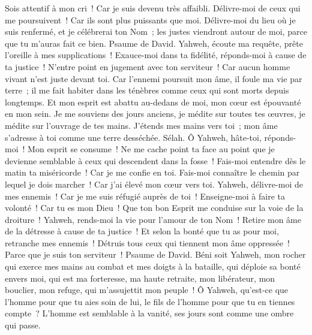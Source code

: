 \begin{multicols}{2}
Sois attentif à mon cri~! Car je suis devenu très affaibli. Délivre-moi de ceux qui me poursuivent~! Car ils sont plus puissants que moi.
Délivre-moi du lieu où je suis renfermé, et je célébrerai ton Nom~; les justes viendront autour de moi, parce que tu m'auras fait ce bien.
\VerseOne{}Psaume de David. Yahweh, écoute ma requête, prête l'oreille à mes supplications~! Exauce-moi dans ta fidélité, réponds-moi à cause de ta justice~!
N'entre point en jugement avec ton serviteur~! Car aucun homme vivant n'est juste devant toi.
Car l'ennemi poursuit mon âme, il foule ma vie par terre~; il me fait habiter dans les ténèbres comme ceux qui sont morts depuis longtemps.
Et mon esprit est abattu au-dedans de moi, mon cœur est épouvanté en mon sein.
Je me souviens des jours anciens, je médite sur toutes tes œuvres, je médite sur l'ouvrage de tes mains.
J'étends mes mains vers toi~; mon âme s'adresse à toi comme une terre desséchée. Sélah.
Ô Yahweh, hâte-toi, réponds-moi~! Mon esprit se consume~! Ne me cache point ta face au point que je devienne semblable à ceux qui descendent dans la fosse~!
Fais-moi entendre dès le matin ta miséricorde~! Car je me confie en toi. Fais-moi connaître le chemin par lequel je dois marcher~! Car j'ai élevé mon cœur vers toi.
Yahweh, délivre-moi de mes ennemis~! Car je me suis réfugié auprès de toi~!
Enseigne-moi à faire ta volonté~! Car tu es mon Dieu~! Que ton bon Esprit me conduise sur la voie de la droiture~!
Yahweh, rends-moi la vie pour l'amour de ton Nom~! Retire mon âme de la détresse à cause de ta justice~!
Et selon la bonté que tu as pour moi, retranche mes ennemis~! Détruis tous ceux qui tiennent mon âme oppressée~! Parce que je suis ton serviteur~!
\VerseOne{}Psaume de David. Béni soit Yahweh, mon rocher qui exerce mes mains au combat et mes doigts à la bataille,
qui déploie sa bonté envers moi, qui est ma forteresse, ma haute retraite, mon libérateur, mon bouclier, mon refuge, qui m'assujettit mon peuple~!
Ô Yahweh, qu'est-ce que l'homme pour que tu aies soin de lui, le fils de l'homme pour que tu en tiennes compte~?
L'homme est semblable à la vanité, ses jours sont comme une ombre qui passe.

\end{multicols}
